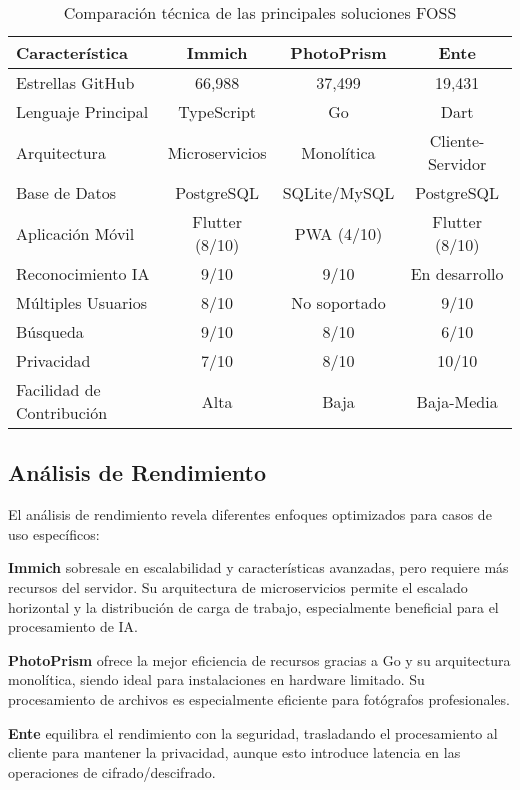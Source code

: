 \begin{table}[h]
\centering
\begin{tabular}{|l|c|c|c|}
\hline
\textbf{Característica} & \textbf{Immich} & \textbf{PhotoPrism} & \textbf{Ente} \\
\hline
Estrellas GitHub & 66,988 & 37,499 & 19,431 \\
Lenguaje Principal & TypeScript & Go & Dart \\
Arquitectura & Microservicios & Monolítica & Cliente-Servidor \\
Base de Datos & PostgreSQL & SQLite/MySQL & PostgreSQL \\
Aplicación Móvil & Flutter (8/10) & PWA (4/10) & Flutter (8/10) \\
Reconocimiento IA & 9/10 & 9/10 & En desarrollo \\
Múltiples Usuarios & 8/10 & No soportado & 9/10 \\
Búsqueda & 9/10 & 8/10 & 6/10 \\
Privacidad & 7/10 & 8/10 & 10/10 \\
Facilidad de Contribución & Alta & Baja & Baja-Media \\
\hline
\end{tabular}
\caption{Comparación técnica de las principales soluciones FOSS}
\label{tab:tech_comparison}
\end{table}

\subsection{Análisis de Rendimiento}

El análisis de rendimiento revela diferentes enfoques optimizados para casos de uso específicos:

\textbf{Immich} sobresale en escalabilidad y características avanzadas, pero requiere más recursos del servidor. Su arquitectura de microservicios permite el escalado horizontal y la distribución de carga de trabajo, especialmente beneficial para el procesamiento de IA.

\textbf{PhotoPrism} ofrece la mejor eficiencia de recursos gracias a Go y su arquitectura monolítica, siendo ideal para instalaciones en hardware limitado. Su procesamiento de archivos es especialmente eficiente para fotógrafos profesionales.

\textbf{Ente} equilibra el rendimiento con la seguridad, trasladando el procesamiento al cliente para mantener la privacidad, aunque esto introduce latencia en las operaciones de cifrado/descifrado.

